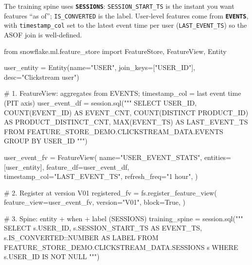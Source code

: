 \documentclass[
  letterpaper,
  DIV=11,
  numbers=noendperiod]{scrreprt}
\newenvironment{Shaded}{\begin{snugshade}}{\end{snugshade}}
\newcommand{\CommentTok}[1]{\textcolor[rgb]{0.37,0.37,0.37}{#1}}
\newcommand{\ImportTok}[1]{\textcolor[rgb]{0.00,0.46,0.62}{#1}}
\newcommand{\NormalTok}[1]{\textcolor[rgb]{0.00,0.23,0.31}{#1}}
\newcommand{\OperatorTok}[1]{\textcolor[rgb]{0.37,0.37,0.37}{#1}}
\newcommand{\StringTok}[1]{\textcolor[rgb]{0.13,0.47,0.30}{#1}}
\newcommand{\VariableTok}[1]{\textcolor[rgb]{0.07,0.07,0.07}{#1}}
\begin{document}
The training spine uses \textbf{\texttt{SESSIONS}}:
\texttt{SESSION\_START\_TS} is the instant you want features ``as of'';
\texttt{IS\_CONVERTED} is the label. User-level features come from
\textbf{\texttt{EVENTS}}, with \texttt{timestamp\_col} set to the latest
event time per user (\texttt{LAST\_EVENT\_TS}) so the ASOF join is
well-defined.

\begin{Shaded}
\begin{Highlighting}[]
\ImportTok{from}\NormalTok{ snowflake.ml.feature\_store }\ImportTok{import}\NormalTok{ FeatureStore, FeatureView, Entity}

\NormalTok{user\_entity }\OperatorTok{=}\NormalTok{ Entity(name}\OperatorTok{=}\StringTok{"USER"}\NormalTok{, join\_keys}\OperatorTok{=}\NormalTok{[}\StringTok{"USER\_ID"}\NormalTok{], desc}\OperatorTok{=}\StringTok{"Clickstream user"}\NormalTok{)}

\CommentTok{\# 1. FeatureView: aggregates from EVENTS; timestamp\_col = last event time (PIT axis)}
\NormalTok{user\_event\_df }\OperatorTok{=}\NormalTok{ session.sql(}\StringTok{"""}
\StringTok{    SELECT}
\StringTok{        USER\_ID,}
\StringTok{        COUNT(EVENT\_ID) AS EVENT\_CNT,}
\StringTok{        COUNT(DISTINCT PRODUCT\_ID) AS PRODUCT\_DISTINCT\_CNT,}
\StringTok{        MAX(EVENT\_TS) AS LAST\_EVENT\_TS}
\StringTok{    FROM FEATURE\_STORE\_DEMO.CLICKSTREAM\_DATA.EVENTS}
\StringTok{    GROUP BY USER\_ID}
\StringTok{"""}\NormalTok{)}

\NormalTok{user\_event\_fv }\OperatorTok{=}\NormalTok{ FeatureView(}
\NormalTok{    name}\OperatorTok{=}\StringTok{"USER\_EVENT\_STATS"}\NormalTok{,}
\NormalTok{    entities}\OperatorTok{=}\NormalTok{[user\_entity],}
\NormalTok{    feature\_df}\OperatorTok{=}\NormalTok{user\_event\_df,}
\NormalTok{    timestamp\_col}\OperatorTok{=}\StringTok{"LAST\_EVENT\_TS"}\NormalTok{,}
\NormalTok{    refresh\_freq}\OperatorTok{=}\StringTok{"1 hour"}\NormalTok{,}
\NormalTok{)}

\CommentTok{\# 2. Register at version V01}
\NormalTok{registered\_fv }\OperatorTok{=}\NormalTok{ fs.register\_feature\_view(}
\NormalTok{    feature\_view}\OperatorTok{=}\NormalTok{user\_event\_fv,}
\NormalTok{    version}\OperatorTok{=}\StringTok{"V01"}\NormalTok{,}
\NormalTok{    block}\OperatorTok{=}\VariableTok{True}\NormalTok{,}
\NormalTok{)}

\CommentTok{\# 3. Spine: entity + when + label (SESSIONS)}
\NormalTok{training\_spine }\OperatorTok{=}\NormalTok{ session.sql(}\StringTok{"""}
\StringTok{    SELECT}
\StringTok{        s.USER\_ID,}
\StringTok{        s.SESSION\_START\_TS AS EVENT\_TS,}
\StringTok{        s.IS\_CONVERTED::NUMBER AS LABEL}
\StringTok{    FROM FEATURE\_STORE\_DEMO.CLICKSTREAM\_DATA.SESSIONS s}
\StringTok{    WHERE s.USER\_ID IS NOT NULL}
\StringTok{"""}\NormalTok{)}


\end{Highlighting}
\end{Shaded}
\end{document}
